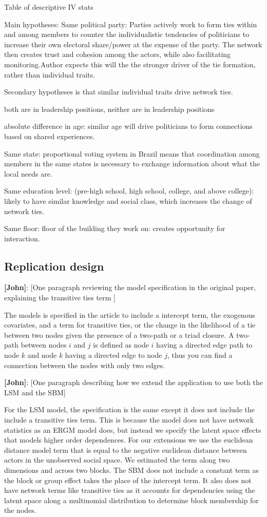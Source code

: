 \documentclass[fleqn,12pt]{wlscirep}
\begin{document}
Table of descriptive IV stats


Main hypotheses: 
Same political party: Parties actively work to form ties within and among members to counter the individualistic tendencies of politicians to increase their own electoral share/power at the expense of the party. The network then creates trust and cohesion among the actors, while also facilitating monitoring.Author expects this will the the stronger driver of the tie formation, rather than individual traits. 

Secondary hypotheses is that similar individual traits drive network ties. 

both are in leadership positions, 
neither are in leadership positions 

absolute difference in age: similar age will drive politicians to form connections based on shared experiences. 

Same state: proportional voting system in Brazil means that coordination among members in the same states is necessary to exchange information about what the local needs are. 

Same education level: (pre-high school, high school, college, and above college): likely to have similar knowledge and social class, which increases the change of network ties. 

Same floor: floor of the building they work on: creates opportunity for interaction.


\subsection{Replication design}

 {\bf [John]}: [One paragraph reviewing the model specification in the original paper, explaining the transitive ties term ]
 
The models is specified in the article to include a intercept term, the exogenous covariates, and a term for transitive ties, or the change in the likelihood of a tie between two nodes given the presence of a two-path or a triad closure. A two-path between nodes $i$ and $j$ is defined as  node $i$ having a directed edge path to node $k$ and node $k$ having a directed edge to node $j$, thus you can find a connection between the nodes with only two edges.
 

 {\bf [John]}: [One paragraph describing how we extend the application to use both the LSM and the SBM]

For the LSM model, the specification is the same except it does not include the include a transitive ties term. This is because the model does not have network statistics as an ERGM model does, but instead we specify the latent space effects that models higher order dependences. For our extensions we use the euclidean distance model term that is equal to the negative euclidean distance between actors in the unobserved social space. We estimated the term along two dimensions and across two blocks. The SBM does not include a constant term as the block or group effect takes the place of the intercept term. It also does not have network terms like transitive ties as it accounts for dependencies using the latent space along a multinomial distribution to determine block membership for the nodes. 
\end{document}
